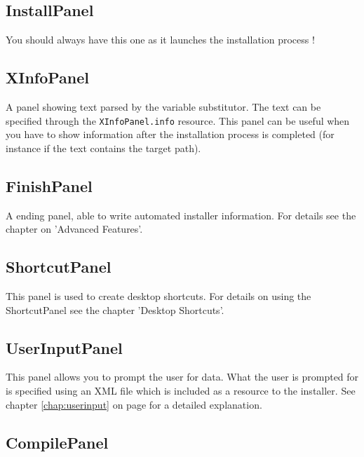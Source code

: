 \subsection{InstallPanel}

You should always have this one as it launches the installation process !\\

\subsection{XInfoPanel}

A panel showing text parsed by the variable substitutor. The text can be
specified through the \texttt{XInfoPanel.info} resource. This panel can
be useful when you have to show information after the installation
process is completed (for instance if the text contains the target
path).\\

\subsection{FinishPanel}

A ending panel, able to write automated installer information. For
details see the chapter on 'Advanced Features'.\\ 

\subsection{ShortcutPanel}

This panel is used to create desktop shortcuts. For details on using the
ShortcutPanel see the chapter 'Desktop Shortcuts'.

\subsection{UserInputPanel}

This panel allows you to prompt the user for data. What the user is prompted
for is specified using an XML file which is included as a resource to the
installer. See chapter \ref{chap:userinput} on page \pageref{chap:userinput}
for a detailed explanation.

\subsection{CompilePanel}

